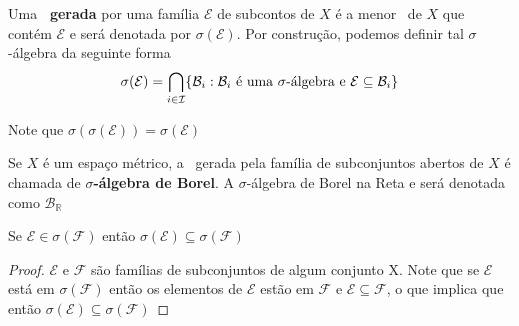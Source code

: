 \begin{definicao}
    Uma \textbf{\sig \ gerada} por uma família $\mathcal{E}$ de subcontos de $X$ é a menor \sig \ de $X$ que contém $\mathcal{E}$ e será denotada por $\sigma (\mathcal{E})$. Por construção, podemos definir tal $\sigma$-álgebra da seguinte forma
    \[
    \sigma(\mathcal{E}) = \bigcap _{i \in \mathcal{I}} \{ \mathcal{B}_i : \mathcal{B}_i \ \text{é uma \sig \ e } \mathcal{E} \subseteq \mathcal{B}_i  \}    
    \]
\end{definicao}

    Note que $\sigma(\sigma(\mathcal{E})) = \sigma(\mathcal{E})$

\begin{definicao}
    Se $X$ é um espaço métrico, a \sig \ gerada pela família de  subconjuntos abertos de $X$ é chamada de \textbf{$\sigma$-álgebra de Borel}. A $\sigma$-álgebra de Borel na Reta e será denotada como $\mathcal{B}_{\mathbb{R}}$
\end{definicao} 



\begin{lema} \label{lema1.2}
    
    Se $\mathcal{E} \in \sigma(\mathcal{F}) $ então $ \sigma(\mathcal{E})  \subseteq  \sigma(\mathcal{F})$

    \begin{proof}
        
        $\mathcal{E}$ e $\mathcal{F}$ são famílias de subconjuntos de algum conjunto X. Note que se $\mathcal{E}$ está em $\sigma(\mathcal{F})$ então os elementos de $\mathcal{E}$ estão em $\mathcal{F}$ e $\mathcal{E} \subseteq \mathcal{F}$, o que implica que então $ \sigma(\mathcal{E})  \subseteq  \sigma(\mathcal{F})$

    \end{proof}

\end{lema}

